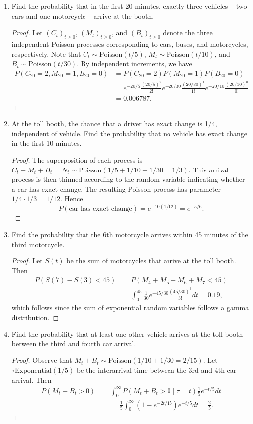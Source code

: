 \documentclass[oneside]{amsart}
\newcommand{\Pois}{\mathrm{Poisson}}
\newcommand{\Exp}{\mathrm{Exponential}}
\theoremstyle{definition}
\begin{document}
\begin{enumerate}[label=(\roman*)]
\item
Find the probability that in the first 20 minutes, exactly three vehicles -- two cars and one motorcycle -- arrive at the booth.
\begin{proof}
Let $(C_t)_{t \geq 0}$, $(M_t)_{t \geq 0}$, and $(B_t)_{t \geq 0}$ denote the three independent Poisson processes corresponding to cars, buses, and motorcycles, respectively. Note that $C_t \sim \Pois(t/5)$, $M_t \sim \Pois(t/10)$, and $B_t \sim \Pois(t/30)$. By independent increments, we have 
\begin{align*}
	P(C_{20} = 2, M_{20} = 1, B_{20}= 0) &=  P(C_{20}= 2) P(M_{20} = 1) P(B_{20}= 0)  \\
	&= e^{-20/5}\frac{(20/5)^2}{2!} e^{-20/30}\frac{(20/30)^1}{1!}   e^{-20/10}\frac{(20/10)^0}{0!}  \\
	&= 0.006787.
\end{align*}
\end{proof}
\item
At the toll booth, the chance that a driver has exact change is 1/4, independent of vehicle. Find the probability that no vehicle has exact change in the first 10 minutes.
\begin{proof}
The superposition of each process is $C_t+M_t+B_t= N_t \sim \Pois(1/5+1/10+1/30=1/3)$. This arrival process is then thinned according to the random variable indicating whether a car has exact change. The resulting Poisson process has parameter $1/4 \cdot 1/3 = 1/12$. Hence
\[
	P(\text{car has exact change}) = e^{-10(1/12)} = e^{-5/6}.
\]
\end{proof}
\item
Find the probability that the 6th motorcycle arrives within 45 minutes of the third motorcycle.
\begin{proof}
Let $S(t)$ be the sum of motorcycles that arrive at the toll booth. Then 
\begin{align*}
	P(S(7) - S(3) < 45) &= P(M_4  + M_5 + M_6  + M_7 < 45) \\
	&= \int_0^{45} \frac{1}{30} e^{-45/30} \frac{(45/30)^{3}}{3!} dt = 0.19,
\end{align*}
which follows since the sum of exponential random variables follows a gamma distribution. 
\end{proof}
\item
Find the probability that at least one other vehicle arrives at the toll booth between the third and fourth car arrival.
\begin{proof}
Observe that $M_t+B_t \sim \Pois(1/10 + 1/30 = 2/15)$. Let $\tau \Exp(1/5)$ be the interarrival time between the 3rd and 4th car arrival. Then 
\begin{align*}
	P(M_t+B_t > 0) =& \int_0^\infty P(M_t+B_t > 0 \mid \tau = t) \frac{1}{5}e^{-t/5} dt \\
	&= \frac{1}{5} \int_0^\infty \left( 1 - e^{-2t/15} \right)e^{-t/5} dt = \frac{2}{5}.
\end{align*}
\end{proof}
\end{enumerate}
\end{document}
